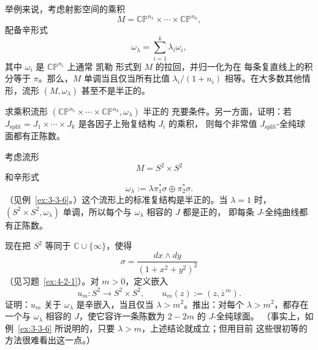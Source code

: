 举例来说，考虑射影空间的乘积
\[
  M=\mathbb{CP}^{n_1}\times\cdots\times\mathbb{CP}^{n_k},
\]
配备辛形式
\[
  \omega_\lambda=\sum_{i=1}^k\lambda_i\omega_i,
\]
其中 $\omega_i$ 是 $\mathbb{CP}^{n_i}$ 上通常 凯勒 形式到 $M$ 的拉回，并归一化为在
每条复直线上的积分等于 $\pi$。那么，$M$ 单调当且仅当所有比值
$\lambda_i/(1+n_i)$ 相等。在大多数其他情形，流形 $(M,\omega_\lambda)$ 甚至不是半正的。

\begin{exercise}\label{ex:6-4-9}
求乘积流形
$(\mathbb{CP}^{n_1}\times\cdots\times\mathbb{CP}^{n_k},\omega_\lambda)$ 半正的
充要条件。另一方面，证明：若
$J_{\mathrm{split}}=J_1\times\cdots\times J_k$ 是各因子上殆复结构 $J_i$ 的乘积，
则每个非常值 $J_{\mathrm{split}}$-全纯球面都有正陈数。
\end{exercise}

\begin{exercise}\label{ex:6-4-10}
考虑流形
\[
  M=S^2\times S^2
\]
和辛形式
\[
  \omega_\lambda:=\lambda\pi_1^*\sigma\oplus\pi_2^*\sigma.
\]
（见例~\ref{ex:3-3-6}。）这个流形上的标准复结构是半正的。当 $\lambda=1$ 时，
$(S^2\times S^2,\omega_\lambda)$ 单调，所以每个与 $\omega_\lambda$ 相容的 $J$ 都是正的，
即每条 $J$-全纯曲线都有正陈数。

现在把 $S^2$ 等同于 $\mathbb C\cup\{\infty\}$，使得
\[
  \sigma=\frac{dx\wedge dy}{(1+x^2+y^2)^2}
\]
（见习题~\ref{ex:4-2-1}）。对 $m>0$，定义嵌入
\[
  u_m:S^2\longrightarrow S^2\times S^2,
  \qquad u_m(z):=(z,\overline z^{\,m}).
\]
证明：$u_m$ 关于 $\omega_\lambda$ 是辛嵌入，当且仅当 $\lambda>m^2$。推出：对每个
$\lambda>m^2$，都存在一个与 $\omega_\lambda$ 相容的 $J$，使它容许一条陈数为
$2-2m$ 的 $J$-全纯球面。
（事实上，如例~\ref{ex:3-3-6} 所说明的，只要 $\lambda>m$，上述结论就成立；但用目前
这些很初等的方法很难看出这一点。）
\end{exercise}

